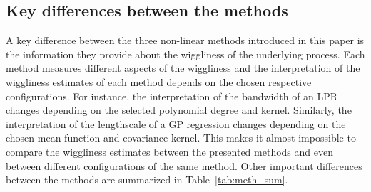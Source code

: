 \documentclass[man, floatsintext]{apa7}
\begin{document}
\subsection{Key differences between the methods}

A key difference between the three non-linear methods introduced in this paper
is the information they provide about the wiggliness of the underlying process.
Each method measures different aspects of the wiggliness and the interpretation
of the wiggliness estimates of each method depends on the chosen respective
configurations. For instance, the interpretation of the bandwidth of an LPR
changes depending on the selected polynomial degree and kernel. Similarly, the
interpretation of the lengthscale of a GP regression changes depending on the
chosen mean function and covariance kernel. This makes it almost impossible to
compare the wiggliness estimates between the presented methods and even between
different configurations of the same method. Other important differences
between the methods are summarized in Table~\ref{tab:meth_sum}.
\end{document}
